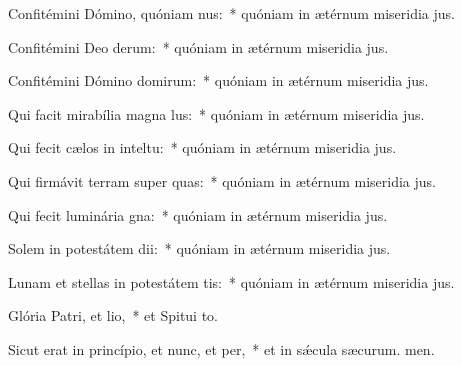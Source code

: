 \item Confitémini Dómino, quóniam nus:~* quóniam in ætérnum miseridia jus.
\item Confitémini Deo derum:~* quóniam in ætérnum miseridia jus.
\item Confitémini Dómino domirum:~* quóniam in ætérnum miseridia jus.
\item Qui facit mirabília magna lus:~* quóniam in ætérnum miseridia jus.
\item Qui fecit cælos in inteltu:~* quóniam in ætérnum miseridia jus.
\item Qui firmávit terram super quas:~* quóniam in ætérnum miseridia jus.
\item Qui fecit luminária gna:~* quóniam in ætérnum miseridia jus.
\item Solem in potestátem dii:~* quóniam in ætérnum miseridia jus.
\item Lunam et stellas in potestátem tis:~* quóniam in ætérnum miseridia jus.
\item Glória Patri, et lio,~* et Spitui to.
\item Sicut erat in princípio, et nunc, et per,~* et in sǽcula sæcurum. men.

